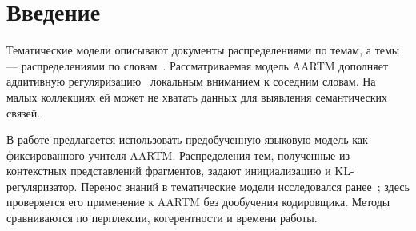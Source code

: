 \section{Введение}
Тематические модели описывают документы распределениями по темам, а темы --- распределениями по словам~\cite{blei2003}. Рассматриваемая модель AARTM дополняет аддитивную регуляризацию~\cite{vorontsov2015} локальным вниманием к соседним словам. На малых коллекциях ей может не хватать данных для выявления семантических связей.

В работе предлагается использовать предобученную языковую модель как фиксированного учителя AARTM. Распределения тем, полученные из контекстных представлений фрагментов, задают инициализацию и KL-регуляризатор. Перенос знаний в тематические модели исследовался ранее~\cite{hoyle2020}; здесь проверяется его применение к AARTM без дообучения кодировщика. Методы сравниваются по перплексии, когерентности и времени работы.
